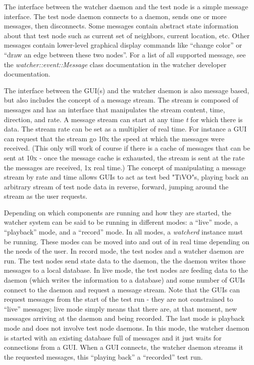 \documentclass{article}
\begin{document}
The interface between the watcher daemon and the test node is a simple message interface. The test node daemon connects
to a daemon, sends one or more messages, then disconnects. Some messages contain abstract state information about that test node
such as current set of neighbors, current location, etc. Other messages contain lower-level graphical display commands like ``change
color'' or ``draw an edge between these two nodes''.  For a list of all supported message, see the {\it watcher::event::Message} class 
documentation in the watcher developer documentation. 

The interface between the GUI(s) and the watcher daemon is also message based, but also includes the concept of a message
stream. The stream is composed of messages and has an interface that manipulates the stream content, time, direction, and rate. A message
stream can start at any time {\it t} for which there is data. The stream rate can be set as a multiplier of real time. For instance
a GUI can request that the stream go 10x the speed at which the messages were received. (This only will work of course if there is 
a cache of messages that can be sent at 10x - once the message cache is exhausted, the stream is sent at the rate the messages
are received, 1x real time.) The concept of manipulating a message stream by rate and time allows GUIs to act as test bed "TiVO"s, playing 
back an arbitrary stream of test node data in reverse, forward, jumping around the stream as the user requests. 

Depending on which components are running and how they are started, the watcher system can be said to be running in different modes: a ``live'' mode, 
a ``playback'' mode, and a ``record'' mode. In all modes, a {\it watcherd} instance must be running.  These modes
can be moved into and out of in real time depending on the needs of the user. In record mode, the test nodes and a watcher daemon are
run. The test nodes send state data to the daemon, the the daemon writes those messages to a local database. In live mode, the test 
nodes are feeding data to the daemon (which writes the information to a database) and some number of GUIs connect to the 
daemon and request a message stream. Note that the GUIs can request messages from the start of the test run - they are not
constrained to ``live'' messages; live mode simply means that there are, at that moment, new messages arriving at the daemon
and being recorded. The last mode is playback mode and does not involve test node daemons. In this mode, the watcher daemon
is started with an existing database full of messages and it just waits for connections from a GUI. When a GUI connects, the 
watcher daemon streams it the requested messages, this ``playing back'' a ``recorded'' test run. 
\end{document}
